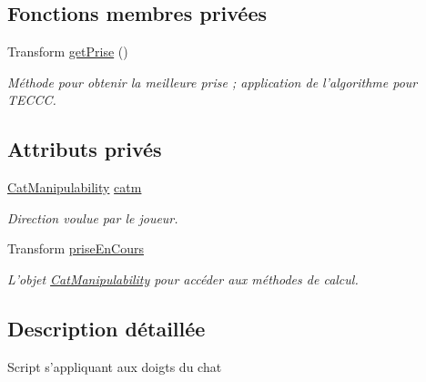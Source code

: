 \subsection*{Fonctions membres privées}
\begin{DoxyCompactItemize}
\item 
Transform \hyperlink{class_mur_doigts_a57b29fe3459f0ea5d0ec022b269509ae}{get\+Prise} ()
\begin{DoxyCompactList}\small\item\em Méthode pour obtenir la meilleure prise ; application de l'algorithme pour T\+E\+C\+C\+C. \end{DoxyCompactList}\end{DoxyCompactItemize}
\subsection*{Attributs privés}
\begin{DoxyCompactItemize}
\item 
\hypertarget{class_mur_doigts_ae22395dd7e5144bb5f660b59964efd48}{\hyperlink{class_cat_manipulability}{Cat\+Manipulability} \hyperlink{class_mur_doigts_ae22395dd7e5144bb5f660b59964efd48}{catm}}\label{class_mur_doigts_ae22395dd7e5144bb5f660b59964efd48}

\begin{DoxyCompactList}\small\item\em Direction voulue par le joueur. \end{DoxyCompactList}\item 
\hypertarget{class_mur_doigts_aff787597b5a25e211db8b2314b34079f}{Transform \hyperlink{class_mur_doigts_aff787597b5a25e211db8b2314b34079f}{prise\+En\+Cours}}\label{class_mur_doigts_aff787597b5a25e211db8b2314b34079f}

\begin{DoxyCompactList}\small\item\em L'objet \hyperlink{class_cat_manipulability}{Cat\+Manipulability} pour accéder aux méthodes de calcul. \end{DoxyCompactList}\end{DoxyCompactItemize}


\subsection{Description détaillée}
Script s'appliquant aux doigts du chat 

